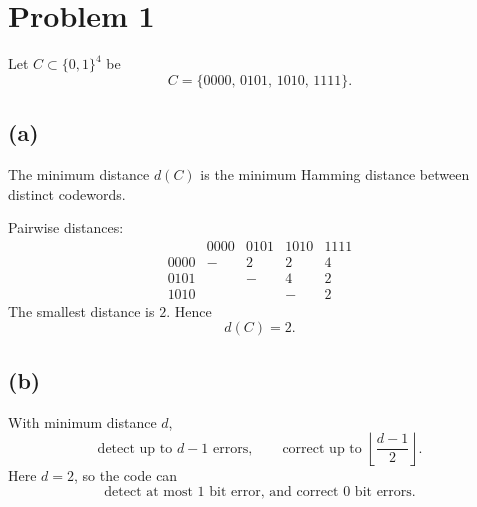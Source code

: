 \section*{Problem 1}

Let \(C \subset \{0,1\}^4\) be
\[
C=\{0000,\,0101,\,1010,\,1111\}.
\]

\subsection*{(a)}
The minimum distance \(d(C)\) is the minimum Hamming distance between distinct codewords.

Pairwise distances:
\[
\begin{array}{c|cccc}
&0000&0101&1010&1111\\\hline
0000&-&2&2&4\\
0101& &-&4&2\\
1010& & &-&2
\end{array}
\]
The smallest distance is \(2\). Hence
\[
d(C)=2.
\]

\subsection*{(b)}
With minimum distance \(d\),
\[
\text{detect up to } d-1 \text{ errors},\qquad
\text{correct up to } \left\lfloor \frac{d-1}{2}\right\rfloor.
\]
Here \(d=2\), so the code can
\[
\text{detect at most }1\text{ bit error, and correct }0\text{ bit errors}.
\]

